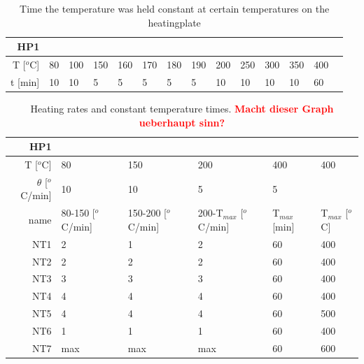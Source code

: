 \documentclass[a4paper]{article}
\newcommand{\td}[1]{\textbf{\textcolor{red}{#1}}}
\newcommand{\oc}{$^o$C}
\begin{document}
\begin{table}[h]
	\centering
	\begin{tabular}{rl ll ll ll ll ll ll }%
		HP1		&&&&&&&&&&&&&\\
		\hline
		T [\oc]	&80		&100	&150	&160	&170 	&180	&190	&200	&250	&300	&350	&400	\\
		t [min]	&10 	&10		&5 		&5 		&5 		&5 &5 &10 &10 &10 &10 &60 \\
		\hline
	\end{tabular}
	\caption{Time the temperature was held constant at certain temperatures on the heatingplate}
	\label{tab:labtech}
\end{table}


\begin{table}[h]
	\centering
	\begin{tabular}{rl ll ll}%
		HP1		&&&&&\\%
		\hline
		T [\oc]				&80		&150	&200	&400	&400 	\\
		$\theta$ [\oc/min]	&10 	&10		&5 		&5		& 		\\
		\hline
		name	&80-150 [\oc/min]	&150-200 [\oc/min]	&200-T$_{max}$ [\oc/min]	&T$_{max}$ [min]	&T$_{max}$ [\oc] \\
		NT1		&2					&1					&2					&60 &400 \\
		NT2		&2					&2					&2					&60 &400 \\
		NT3		&3					&3					&3					&60 &400 \\
		NT4		&4					&4					&4					&60 &400 \\
		NT5		&4					&4					&4					&60 &500 \\
		NT6		&1					&1					&1					&60 &400 \\
		NT7		&max				&max				&max				&60 &600 \\
		\hline
	\end{tabular}
	\caption{Heating rates and constant temperature times. \td{Macht dieser Graph ueberhaupt sinn? }}
	\label{tab:nt}
\end{table}
\end{document}
